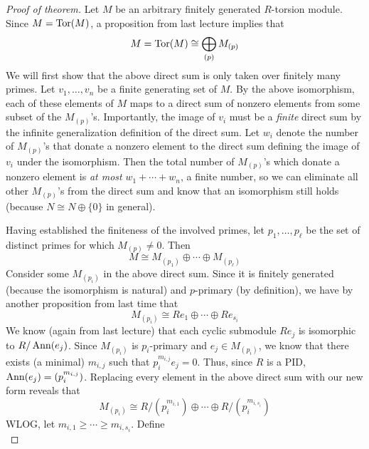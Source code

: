 \documentclass[../notes.tex]{subfiles}
\begin{document}
\begin{itemize}
\begin{proof}[Proof of theorem]
        Let $M$ be an arbitrary finitely generated $R$-torsion module. Since $M=\operatorname{Tor}(M)$, a proposition from last lecture implies that
        \begin{equation*}
            M = \operatorname{Tor}(M) \cong \bigoplus_{(p)}M_{(p)}
        \end{equation*}
        We will first show that the above direct sum is only taken over finitely many primes. Let $v_1,\dots,v_n$ be a finite generating set of $M$. By the above isomorphism, each of these elements of $M$ maps to a direct sum of nonzero elements from some subset of the $M_{(p)}$'s. Importantly, the image of $v_i$ must be a \emph{finite} direct sum by the infinite generalization definition of the direct sum. Let $w_i$ denote the number of $M_{(p)}$'s that donate a nonzero element to the direct sum defining the image of $v_i$ under the isomorphism. Then the total number of $M_{(p)}$'s which donate a nonzero element is \emph{at most} $w_1+\cdots+w_n$, a finite number, so we can eliminate all other $M_{(p)}$'s from the direct sum and know that an isomorphism still holds (because $N\cong N\oplus\{0\}$ in general).\par
        Having established the finiteness of the involved primes, let $p_1,\dots,p_\ell$ be the set of distinct primes for which $M_{(p)}\neq 0$. Then
        \begin{equation*}
            M \cong M_{(p_1)}\oplus\cdots\oplus M_{(p_\ell)}
        \end{equation*}
        Consider some $M_{(p_i)}$ in the above direct sum. Since it is finitely generated (because the isomorphism is natural) and $p$-primary (by definition), we have by another proposition from last time that
        \begin{equation*}
            M_{(p_i)} \cong Re_1\oplus\cdots\oplus Re_{s_i}
        \end{equation*}
        We know (again from last lecture) that each cyclic submodule $Re_j$ is isomorphic to $R/\operatorname{Ann}(e_j)$. Since $M_{(p_i)}$ is $p_i$-primary and $e_j\in M_{(p_i)}$, we know that there exists (a minimal) $m_{i,j}$ such that $p_i^{m_{i,j}}e_j=0$. Thus, since $R$ is a PID, $\operatorname{Ann}(e_j)=(p_i^{m_{i,j}})$. Replacing every element in the above direct sum with our new form reveals that
        \begin{equation*}
            M_{(p_i)} \cong R/(p_i^{m_{i,1}})\oplus\cdots\oplus R/(p_i^{m_{i,s_i}})
        \end{equation*}
        WLOG, let $m_{i,1}\geq\cdots\geq m_{i,s_i}$. Define
        \begin{equation*}

\end{equation*}
\end{proof}
\end{itemize}
\end{document}
